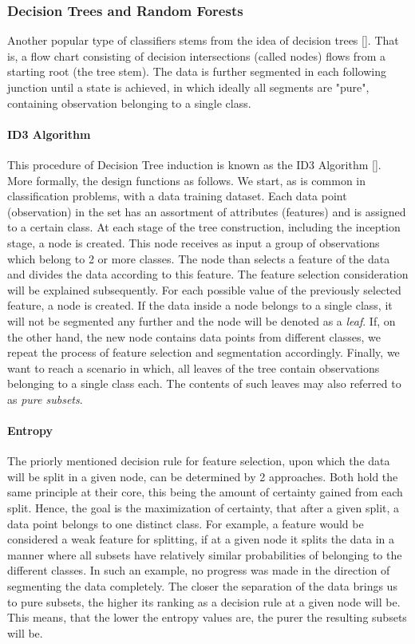 \subsubsection{Decision Trees and Random Forests}
	Another popular type of classifiers stems from the idea of decision trees [\cite{quinlan2014c4}]. That is, a flow chart consisting of decision intersections (called nodes) flows from a starting root (the tree stem). The data is further segmented in each following junction until a state is achieved, in which ideally all segments are "pure", containing observation belonging to a single class. 
		
	\paragraph{ID3 Algorithm} 
		This procedure of Decision Tree induction is known as the ID3 Algorithm [\cite{quinlan1986induction}]. More formally, the design functions as follows. We start, as is common in classification problems, with a data training dataset. Each data point (observation) in the set has an assortment of attributes (features) and is assigned to a certain class. At each stage of the tree construction, including the inception stage, a node is created. This node receives as input a group of observations which belong to 2 or more classes. The node than selects a feature of the data and divides the data according to this feature. The feature selection consideration will be explained subsequently. For each possible value of the previously selected feature, a node is created. If the data inside a node belongs to a single class, it will not be segmented any further and the node will be denoted as a \textit{leaf}. If, on the other hand, the new node contains data points from different classes, we repeat the process of feature selection and segmentation accordingly. Finally, we want to reach a scenario in which, all leaves of the tree contain observations belonging to a single class each. The contents of such leaves may also referred to as \textit{pure subsets}.
		
	\paragraph{Entropy}
		The priorly mentioned decision rule for feature selection, upon which the data will be split in a given node, can be determined by 2 approaches. Both hold the same principle at their core, this being the amount of certainty gained from each split. Hence, the goal is the maximization of certainty, that after a given split, a data point belongs to one distinct class. For example, a feature would be considered a weak feature for splitting, if at a given node it splits the data in a manner where all subsets have relatively similar probabilities of belonging to the different classes. In such an example, no progress was made in the direction of segmenting the data completely. The closer the separation of the data brings us to pure subsets, the higher its ranking as a decision rule at a given node will be. This means, that the lower the entropy values are, the purer the resulting subsets will be.
		
